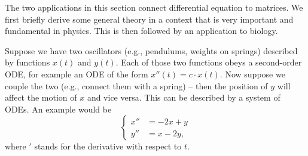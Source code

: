 \begin{application}
The two applications in this section connect differential equation to matrices. We first briefly derive some general theory in a context that is very important and fundamental in physics. This is then followed by an application to biology.

Suppose we have two oscillators (e.g., pendulums, weights on springs) described by functions $x(t)$ and $y(t)$. Each of those two functions obeys a second-order ODE, for example an ODE of the form $x''(t)=c\cdot x(t)$. Now suppose we couple the two (e.g., connect them with a spring) -- then the position of $y$ will affect the motion of $x$ and vice versa. This can be described by a system of ODEs. An example would be
\begin{equation}
\label{eq:coupled_sys_orig}
\begin{cases}
x'' & = -2x+y \\ y'' & = x-2y,
\end{cases}\end{equation}
where $'$ stands for the derivative with respect to $t$.


\end{application}
